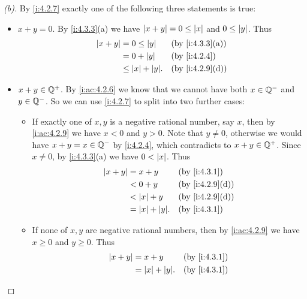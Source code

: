 \begin{proof}[(b)]
  By \cref{i:4.2.7} exactly one of the following three statements is true:
  \begin{itemize}
    \item \(x + y = 0\).
          By \cref{i:4.3.3}(a) we have \(\left\lvert x + y\right\rvert = 0 \leq \left\lvert x\right\rvert\) and \(0 \leq \left\lvert y\right\rvert\).
          Thus
          \begin{align*}
            \abs{x + y} & = 0 \leq \abs{y}        &  & \by{i:4.3.3}[a] \\
                        & = 0 + \abs{y}           &  & \by{i:4.2.4}    \\
                        & \leq \abs{x} + \abs{y}. &  & \by{i:4.2.9}[d]
          \end{align*}
    \item \(x + y \in \mathbb{Q}^+\).
          By \cref{i:ac:4.2.6} we know that we cannot have both \(x \in \mathbb{Q}^-\) and \(y \in \mathbb{Q}^-\).
          So we can use \cref{i:4.2.7} to split into two further cases:
          \begin{itemize}
            \item If exactly one of \(x, y\) is a negative rational number, say \(x\), then by \cref{i:ac:4.2.9} we have \(x < 0\) and \(y > 0\).
                  Note that \(y \neq 0\), otherwise we would have \(x + y = x \in \mathbb{Q}^-\) by \cref{i:4.2.4}, which contradicts to \(x + y \in \mathbb{Q}^+\).
                  Since \(x \neq 0\), by \cref{i:4.3.3}(a) we have \(0 < \left\lvert x\right\rvert\).
                  Thus
                  \begin{align*}
                    \abs{x + y} & = x + y              &  & \by{i:4.3.1}    \\
                                & < 0 + y              &  & \by{i:4.2.9}[d] \\
                                & < \abs{x} + y        &  & \by{i:4.2.9}[d] \\
                                & = \abs{x} + \abs{y}. &  & \by{i:4.3.1}
                  \end{align*}
            \item If none of \(x, y\) are negative rational numbers, then by \cref{i:ac:4.2.9} we have \(x \geq 0\) and \(y \geq 0\).
                  Thus
                  \begin{align*}
                    \abs{x + y} & = x + y              &  & \by{i:4.3.1} \\
                                & = \abs{x} + \abs{y}. &  & \by{i:4.3.1}
                  \end{align*}

\end{itemize}
\end{itemize}
\end{proof}
